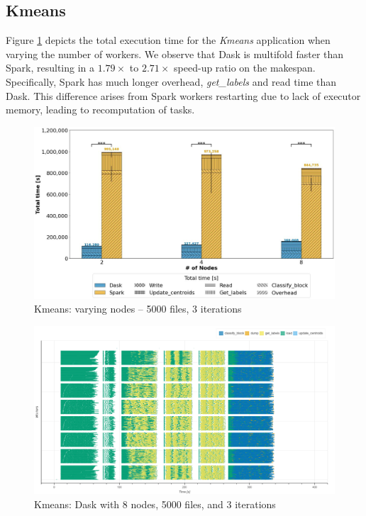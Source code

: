 \documentclass[AMA,STIX1COL]{WileyNJD-v2}
\begin{document}
\subsection{Kmeans}
Figure \ref{fig:kmeans_worker} depicts the total execution time for the \textit{Kmeans} application when varying the number of workers.
We observe that Dask is multifold faster than Spark, resulting in a $1.79\times$ to $2.71\times$ speed-up ratio on the makespan.
Specifically, Spark has much longer overhead, \textit{get\_labels} and read time than Dask.
This difference arises from Spark workers restarting due to lack of executor memory, leading to recomputation of tasks.

\begin{figure}[!h]
	\centering
	\includegraphics[clip,width=0.75\columnwidth]{figures/stacked_kmeans_worker.jpg}
	\caption{Kmeans: varying nodes -- 5000 files, 3 iterations}
	\label{fig:kmeans_worker}
\end{figure}
		
\begin{figure}[!h]
	\centering
	\includegraphics[clip,width=\columnwidth]{figures/dask_kmeans_gantt.png}
	\caption{Kmeans: Dask with 8 nodes, 5000 files, and 3 iterations}
	\label{fig:dask_kmeans_gantt}
\end{figure}
		
\end{document}
